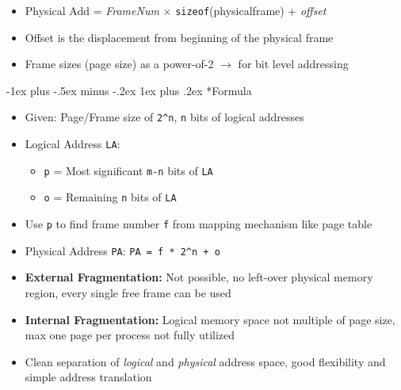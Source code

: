 \documentclass[10pt,landscape]{article}
\makeatletter
\renewcommand{\subsubsection}{\@startsection{subsubsection}{3}{0mm}%
                                {-1ex plus -.5ex minus -.2ex}%
                                {1ex plus .2ex}%
                                {\normalfont\small\bfseries}}
\makeatother
\begin{document}
\begin{multicols*}{3}
\begin{itemize}[topsep=0pt,noitemsep,wide=0pt, leftmargin=\dimexpr{} + 2\relax]
    \item Physical Add = \textit{FrameNum} $\times$ \verb|sizeof|(physicalframe) + \textit{offset}
    \item Offset is the displacement from beginning of the physical frame
    \item Frame sizes (page size) as a power-of-2 $\rightarrow$ for bit level addressing
\end{itemize}


\subsubsection*{Formula}
\begin{itemize}[topsep=0pt,noitemsep,wide=0pt, leftmargin=\dimexpr{} + 2\relax]
    \item Given: Page/Frame size of \verb|2^n|, \verb|n| bits of logical addresses
    \item Logical Address \verb|LA|:
    \begin{itemize}[topsep=0pt,noitemsep,wide=0pt, leftmargin=\dimexpr{} + 2\relax]
        \item \verb|p| = Most significant \verb|m-n| bits of \verb|LA|
        \item \verb|o| = Remaining \verb|n| bits of \verb|LA|
    \end{itemize}
    \item Use \verb|p| to find frame number \verb|f| from mapping mechanism like page table
    \item Physical Address \verb|PA|: \verb|PA = f * 2^n + o|
\end{itemize}

\begin{itemize}[topsep=0pt,noitemsep,wide=0pt, leftmargin=\dimexpr{} + 2\relax]
    \item \textbf{External Fragmentation:} Not possible, no left-over physical memory region, every single free frame can be used
    \item \textbf{Internal Fragmentation:} Logical memory space not multiple of page size, max one page per process not fully utilized
    \item Clean separation of \textit{logical} and \textit{physical} address space, good flexibility and simple address translation
\end{itemize}


\end{multicols*}
\end{document}
